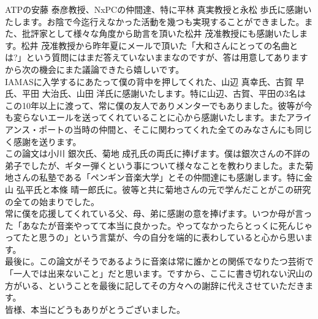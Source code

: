 \documentclass[uplatex,dvipdfmx]{ujarticle}
\begin{document}
ATPの安藤 泰彦教授、NxPCの仲間達、特に平林 真実教授と永松 歩氏に感謝いたします。お陰で今迄行えなかった活動を幾つも実現することができました。また、批評家として様々な角度から助言を頂いた松井 茂准教授にも感謝いたします。松井 茂准教授から昨年夏にメールで頂いた「大和さんにとっての名曲とは?」という質問にはまだ答えていないままなのですが、答は用意してありますから次の機会にまた議論できたら嬉しいです。\\

IAMASに入学するにあたって僕の背中を押してくれた、山辺 真幸氏、古賀 早氏、平田 大治氏、山田 洋氏に感謝いたします。特に山辺、古賀、平田の3名はこの10年以上に渡って、常に僕の友人でありメンターでもありました。彼等が今も変らないエールを送ってくれていることに心から感謝いたします。またアライアンス・ポートの当時の仲間と、そこに関わってくれた全てのみなさんにも同じく感謝を送ります。\\

この論文は小川 銀次氏、菊地 成孔氏の両氏に捧げます。僕は銀次さんの不詳の弟子でしたが、ギター弾くという事について様々なことを教わりました。また菊地さんの私塾である「ペンギン音楽大学」とその仲間達にも感謝します。特に金山 弘平氏と本條 晴一郎氏に。彼等と共に菊地さんの元で学んだことがこの研究の全ての始まりでした。\\

常に僕を応援してくれている父、母、弟に感謝の意を捧げます。いつか母が言った「あなたが音楽やってて本当に良かった。やってなかったらとっくに死んじゃってたと思うの」という言葉が、今の自分を端的に表わしていると心から思います。\\

最後に。この論文がそうであるように音楽は常に誰かとの関係でなりたつ芸術で「一人では出来ないこと」だと思います。ですから、ここに書き切れない沢山の方がいる、ということを最後に記してその方々への謝辞に代えさせていただきます。\\

皆様、本当にどうもありがとうございました。
\end{document}
